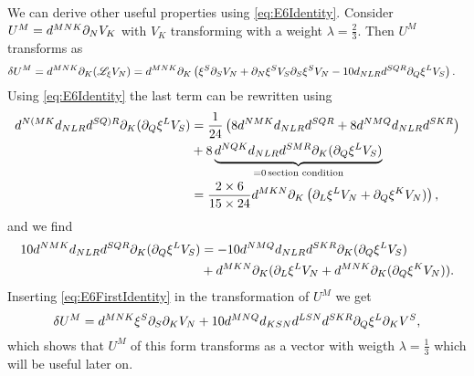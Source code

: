 We can derive other useful properties using \eqref{eq:E6Identity}. Consider $U^M=d^{MNK}\partial_NV_K$ with $V_K$ transforming with a weight $\lambda=\frac{2}{3}$. Then $U^M$ transforms as 
\begin{equation}
    \begin{aligned}
        \delta U^M = d^{MNK}\partial_K(\mathscr{L}_\xi V_N) &= d^{MNK}\partial_K\left(\xi^S\partial_SV_N+\partial_N\xi^SV_S\partial_S\xi^SV_N-10d_{NLR}d^{SQR}\partial_Q\xi^LV_S\right).
    \end{aligned}
\end{equation}
Using \eqref{eq:E6Identity} the last term can be rewritten using 
\begin{equation}
    \begin{aligned}
    d^{N(MK}d_{NLR}d^{SQ)R}\partial_K(\partial_Q\xi^LV_S) &= \frac{1}{24}\left(8d^{NMK}d_{NLR}d^{SQR}+8d^{NMQ}d_{NLR}d^{SKR}\right)\\
    &+8\underbrace{d^{NQK}d_{NLR}d^{SMR}\partial_K(\partial_Q\xi^LV_S)}_{=0\, \text{section condition}}\\
    &= \frac{2\times 6}{15\times 24}d^{MKN}\partial_K\left(\partial_L\xi^LV_N+\partial_Q\xi^KV_N)\right),
    \end{aligned}
\end{equation}
and we find 
\begin{equation}\label{eq:E6FirstIdentity}
    \begin{aligned}
    10d^{NMK}d_{NLR}d^{SQR}\partial_K(\partial_Q\xi^LV_S) &= -10d^{NMQ}d_{NLR}d^{SKR}\partial_K(\partial_Q\xi^LV_S)\\
    &+d^{MKN}\partial_K(\partial_L\xi^LV_N+d^{MNK}\partial_K(\partial_Q\xi^KV_N)).
    \end{aligned}
\end{equation}
Inserting \eqref{eq:E6FirstIdentity} in the transformation of $U^M$ we get 
\begin{equation}
    \delta U^M = d^{MNK}\xi^S\partial_S\partial_KV_N+10d^{MNQ}d_{KSN}d^{LSN}d^{SKR}\partial_Q\xi^L\partial_KV^S,
\end{equation}
which shows that $U^M$ of this form transforms as a vector with weigth $\lambda=\frac{1}{3}$ which will be useful later on. 


